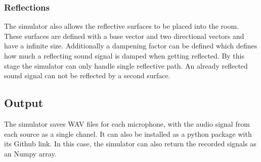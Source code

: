 \subsubsection{Reflections}
The simulator also allows the reflective surfaces to be placed into the room.
These surfaces are defined with a base vector and two directional vectors and have a infinite size.
Additionally a dampening factor can be defined which defines how much
a reflecting sound signal is damped when getting reflected.
By this stage the simulator can only handle single reflective path.
An already reflected sound signal can not be reflected by a second surface.

\subsection{Output}
The simulator saves WAV files for each microphone, with the audio signal from
each source as a single chanel.
It can also be installed as a python package with its Github link.
In this case, the simulator can also return the recorded signals as an
Numpy array.

